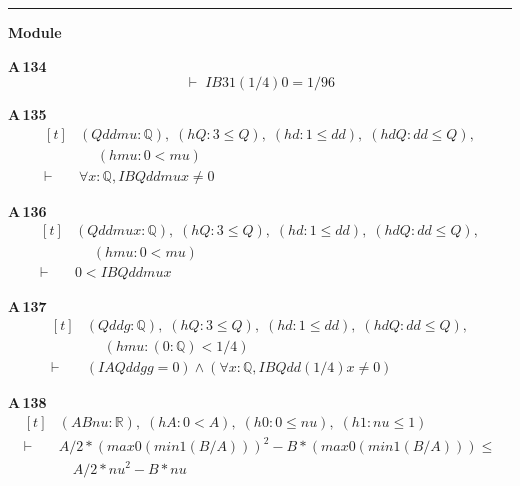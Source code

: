 \vspace{4pt}\noindent\rule{\columnwidth}{0.4pt}\par\vspace{2pt}
\noindent\textbf{Module }\par\vspace{3pt}

\noindent\textbf{A\,134}\quad{}
{\footnotesize\[ \vdash\; \mathit{IB} 3 1 (1/4) 0 = 1/96 \]}

\noindent\textbf{A\,135}\quad{}
{\footnotesize\[ \begin{aligned}[t]
&(\mathit{Q} \mathit{dd} \mathit{mu} : \mathbb{Q} ),\; (\mathit{hQ} : 3 \leq \mathit{Q}),\; (\mathit{hd} : 1 \leq \mathit{dd}),\; (\mathit{hdQ} : \mathit{dd} \leq \mathit{Q}),\\
&\quad \; (\mathit{hmu} : 0 < \mathit{mu})\\
\vdash\;&\forall \mathit{x} : \mathbb{Q} , \mathit{IB} \mathit{Q} \mathit{dd} \mathit{mu} \mathit{x} \neq 0
\end{aligned} \]}

\noindent\textbf{A\,136}\quad{}
{\footnotesize\[ \begin{aligned}[t]
&(\mathit{Q} \mathit{dd} \mathit{mu} \mathit{x} : \mathbb{Q} ),\; (\mathit{hQ} : 3 \leq \mathit{Q}),\; (\mathit{hd} : 1 \leq \mathit{dd}),\; (\mathit{hdQ} : \mathit{dd} \leq \mathit{Q}),\\
&\quad \; (\mathit{hmu} : 0 < \mathit{mu})\\
\vdash\;&0 < \mathit{IB} \mathit{Q} \mathit{dd} \mathit{mu} \mathit{x}
\end{aligned} \]}

\noindent\textbf{A\,137}\quad{}
{\footnotesize\[ \begin{aligned}[t]
&(\mathit{Q} \mathit{dd} \mathit{g} : \mathbb{Q} ),\; (\mathit{hQ} : 3 \leq \mathit{Q}),\; (\mathit{hd} : 1 \leq \mathit{dd}),\; (\mathit{hdQ} : \mathit{dd} \leq \mathit{Q}),\\
&\quad \; (\mathit{hmu} : (0:\mathbb{Q} ) < 1/4)\\
\vdash\;&(\mathit{IA} \mathit{Q} \mathit{dd} \mathit{g} \mathit{g} = 0) \wedge (\forall \mathit{x} : \mathbb{Q} , \mathit{IB} \mathit{Q} \mathit{dd} (1/4) \mathit{x} \neq 0)
\end{aligned} \]}

\noindent\textbf{A\,138}\quad{}
{\footnotesize\[ \begin{aligned}[t]
&(\mathit{A} \mathit{B} \mathit{nu} : \mathbb{R} ),\; (\mathit{hA} : 0 < \mathit{A}),\; (\mathit{h0} : 0 \leq \mathit{nu}),\; (\mathit{h1} : \mathit{nu} \leq 1)\\
\vdash\;&\mathit{A} / 2 * (\mathit{max} 0 (\mathit{min} 1 (\mathit{B} / \mathit{A}))) ^{2} - \mathit{B} * (\mathit{max} 0 (\mathit{min} 1 (\mathit{B} / \mathit{A}))) \leq\\
&\quad \mathit{A} / 2 * \mathit{nu} ^{2} - \mathit{B} * \mathit{nu}
\end{aligned} \]}

